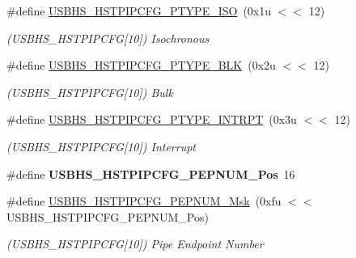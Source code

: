 \begin{DoxyCompactItemize}
\#define \mbox{\hyperlink{group__SAME70__USBHS_ga6b03ffb635a9a12458fc316d49bfb18e}{U\+S\+B\+H\+S\+\_\+\+H\+S\+T\+P\+I\+P\+C\+F\+G\+\_\+\+P\+T\+Y\+P\+E\+\_\+\+I\+SO}}~(0x1u $<$$<$ 12)
\begin{DoxyCompactList}\small\item\em (U\+S\+B\+H\+S\+\_\+\+H\+S\+T\+P\+I\+P\+C\+FG\mbox{[}10\mbox{]}) Isochronous \end{DoxyCompactList}\item 
\mbox{\label{group__SAME70__USBHS_ga5d745287ca3ffa08bf8a024ee2217c94}} 
\#define \mbox{\hyperlink{group__SAME70__USBHS_ga5d745287ca3ffa08bf8a024ee2217c94}{U\+S\+B\+H\+S\+\_\+\+H\+S\+T\+P\+I\+P\+C\+F\+G\+\_\+\+P\+T\+Y\+P\+E\+\_\+\+B\+LK}}~(0x2u $<$$<$ 12)
\begin{DoxyCompactList}\small\item\em (U\+S\+B\+H\+S\+\_\+\+H\+S\+T\+P\+I\+P\+C\+FG\mbox{[}10\mbox{]}) Bulk \end{DoxyCompactList}\item 
\mbox{\label{group__SAME70__USBHS_ga01cade33091230dcb050c23aadee6dde}} 
\#define \mbox{\hyperlink{group__SAME70__USBHS_ga01cade33091230dcb050c23aadee6dde}{U\+S\+B\+H\+S\+\_\+\+H\+S\+T\+P\+I\+P\+C\+F\+G\+\_\+\+P\+T\+Y\+P\+E\+\_\+\+I\+N\+T\+R\+PT}}~(0x3u $<$$<$ 12)
\begin{DoxyCompactList}\small\item\em (U\+S\+B\+H\+S\+\_\+\+H\+S\+T\+P\+I\+P\+C\+FG\mbox{[}10\mbox{]}) Interrupt \end{DoxyCompactList}\item 
\mbox{\label{group__SAME70__USBHS_gaa9d97ab3406c0f2e769a229c85a14ec6}} 
\#define {\bfseries U\+S\+B\+H\+S\+\_\+\+H\+S\+T\+P\+I\+P\+C\+F\+G\+\_\+\+P\+E\+P\+N\+U\+M\+\_\+\+Pos}~16
\item 
\mbox{\label{group__SAME70__USBHS_gae4c427ae7b00860d3e38d2fb3a3b1cd5}} 
\#define \mbox{\hyperlink{group__SAME70__USBHS_gae4c427ae7b00860d3e38d2fb3a3b1cd5}{U\+S\+B\+H\+S\+\_\+\+H\+S\+T\+P\+I\+P\+C\+F\+G\+\_\+\+P\+E\+P\+N\+U\+M\+\_\+\+Msk}}~(0xfu $<$$<$ U\+S\+B\+H\+S\+\_\+\+H\+S\+T\+P\+I\+P\+C\+F\+G\+\_\+\+P\+E\+P\+N\+U\+M\+\_\+\+Pos)
\begin{DoxyCompactList}\small\item\em (U\+S\+B\+H\+S\+\_\+\+H\+S\+T\+P\+I\+P\+C\+FG\mbox{[}10\mbox{]}) Pipe Endpoint Number \end{DoxyCompactList}\item 

\end{DoxyCompactItemize}
